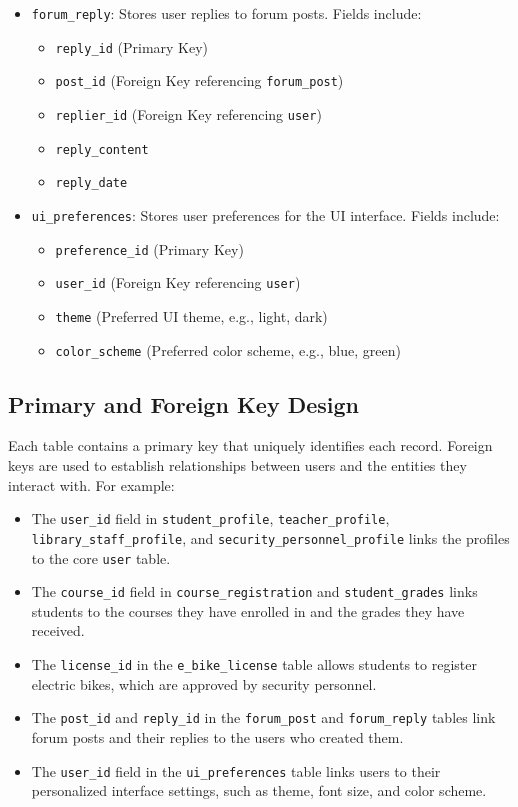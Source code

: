 \documentclass[12pt]{article}
\begin{document}
\begin{itemize}
    \item \texttt{forum\_reply}: Stores user replies to forum posts. Fields include:
    \begin{itemize}
        \item \texttt{reply\_id} (Primary Key)
        \item \texttt{post\_id} (Foreign Key referencing \texttt{forum\_post})
        \item \texttt{replier\_id} (Foreign Key referencing \texttt{user})
        \item \texttt{reply\_content}
        \item \texttt{reply\_date}
    \end{itemize}

    \item \texttt{ui\_preferences}: Stores user preferences for the UI interface. Fields include:
    \begin{itemize}
        \item \texttt{preference\_id} (Primary Key)
        \item \texttt{user\_id} (Foreign Key referencing \texttt{user})
        \item \texttt{theme} (Preferred UI theme, e.g., light, dark)
        \item \texttt{color\_scheme} (Preferred color scheme, e.g., blue, green)
    \end{itemize}
\end{itemize}

\subsection{Primary and Foreign Key Design}
Each table contains a primary key that uniquely identifies each record. Foreign keys are used to establish relationships between users and the entities they interact with. For example:
\begin{itemize}
    \item The \texttt{user\_id} field in \texttt{student\_profile}, \texttt{teacher\_profile}, 
    \texttt{library\_staff\_profile}, and \texttt{security\_personnel\_profile} links the 
    profiles to the core \texttt{user} table.
    \item The \texttt{course\_id} field in \texttt{course\_registration} and \texttt{student\_grades} links 
    students to the courses they have enrolled in and the grades they have received.
    \item The \texttt{license\_id} in the \texttt{e\_bike\_license} table allows students 
    to register electric bikes, which are approved by security personnel.
    \item The \texttt{post\_id} and \texttt{reply\_id} in the \texttt{forum\_post} and \texttt{forum\_reply} 
    tables link forum posts and their replies to the users who created them.
    \item The \texttt{user\_id} field in the \texttt{ui\_preferences} table links users to their personalized 
    interface settings, such as theme, font size, and color scheme.
\end{itemize}
\end{document}

